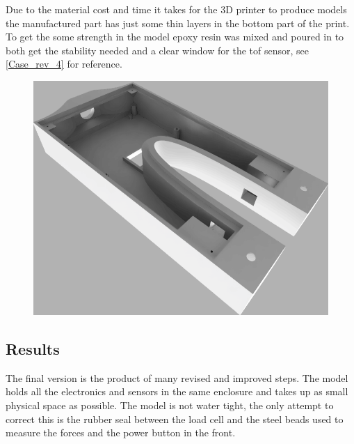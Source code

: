 Due to the material cost and time it takes for the 3D printer to produce models the manufactured part has just some thin layers in the bottom part of the print. To get the some strength in the model epoxy resin was mixed and poured in to both get the stability needed and a clear window for the \gls{tof} sensor, see \autoref{Case_rev_4} for reference.

\begin{figure}[H]
\begin{center}
	\includegraphics[width = .8\textwidth]{Figures/Case_rev_4.png}
	\label{Case_rev_4}
\end{center}
\end{figure}

\subsection{Results}
The final version is the product of many revised and improved steps. The model holds all the electronics and sensors in the same enclosure and takes up as small physical space as possible. The model is not water tight, the only attempt to correct this is the rubber seal between the load cell and the steel beads used to measure the forces and the power button in the front.

